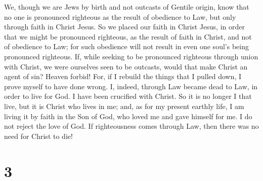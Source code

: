  We, though we are Jews by birth and not outcasts of
Gentile origin, know that no one is pronounced righteous as the result
of obedience to Law, but only through faith in Christ Jesus.
 So we placed our faith in Christ Jesus, in order that we
might be pronounced righteous, as the result of faith in Christ, and not
of obedience to Law; for such obedience will not result in even one
soul's being pronounced righteous.  If, while seeking to be
pronounced righteous through union with Christ, we were ourselves seen
to be outcasts, would that make Christ an agent of sin? Heaven forbid!
 For, if I rebuild the things that I pulled down, I prove
myself to have done wrong.  I, indeed, through Law became
dead to Law, in order to live for God.  I have been
crucified with Christ. So it is no longer I that live, but it is Christ
who lives in me; and, as for my present earthly life, I am living it by
faith in the Son of God, who loved me and gave himself for me.
 I do not reject the love of God. If righteousness comes
through Law, then there was no need for Christ to die!

\hypertarget{section-2}{%
\section{3}\label{section-2}}


